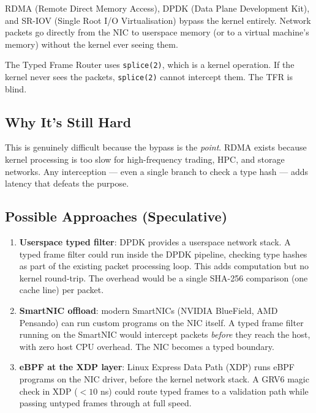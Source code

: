 \documentclass[11pt,a4paper]{article}
\begin{document}
RDMA (Remote Direct Memory Access), DPDK (Data Plane Development Kit),
and SR-IOV (Single Root I/O Virtualisation) bypass the kernel entirely.
Network packets go directly from the NIC to userspace memory (or to a
virtual machine's memory) without the kernel ever seeing them.

The Typed Frame Router uses \texttt{splice(2)}, which is a kernel
operation. If the kernel never sees the packets, \texttt{splice(2)}
cannot intercept them. The TFR is blind.

\subsection{Why It's Still Hard}

This is genuinely difficult because the bypass is the \emph{point}.
RDMA exists because kernel processing is too slow for high-frequency
trading, HPC, and storage networks. Any interception --- even a single
branch to check a type hash --- adds latency that defeats the purpose.

\subsection{Possible Approaches (Speculative)}

\begin{enumerate}
\item \textbf{Userspace typed filter}: DPDK provides a userspace network
  stack. A typed frame filter could run inside the DPDK pipeline,
  checking type hashes as part of the existing packet processing loop.
  This adds computation but no kernel round-trip. The overhead would be
  a single SHA-256 comparison (one cache line) per packet.

\item \textbf{SmartNIC offload}: modern SmartNICs (NVIDIA BlueField,
  AMD Pensando) can run custom programs on the NIC itself. A typed frame
  filter running on the SmartNIC would intercept packets \emph{before}
  they reach the host, with zero host CPU overhead. The NIC becomes a
  typed boundary.

\item \textbf{eBPF at the XDP layer}: Linux Express Data Path (XDP)
  runs eBPF programs on the NIC driver, before the kernel network stack.
  A GRV6 magic check in XDP ($< 10$ ns) could route typed frames to a
  validation path while passing untyped frames through at full speed.
\end{enumerate}
\end{document}
